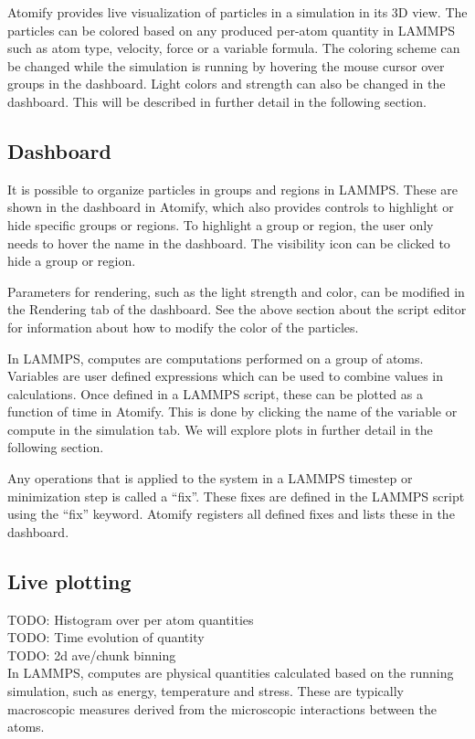 \documentclass[aps,pre,twocolumn,letterpaper,floatfix,nofootinbib]{revtex4}
\begin{document}
Atomify provides live visualization of particles in a simulation in its 3D view. 
The particles can be colored based on any produced per-atom quantity in LAMMPS such as
atom type, velocity, force or a variable formula.
The coloring scheme can be changed while the simulation is running by hovering
the mouse cursor over groups in the dashboard.
Light colors and strength can also be changed in the dashboard.
This will be described in further detail in the following section.

\subsection{Dashboard}

It is possible to organize particles in groups and regions in LAMMPS.
These are shown in the dashboard in Atomify, which also provides controls to
highlight or hide specific groups or regions.
To highlight a group or region, the user only needs to hover the name in the
dashboard.
The visibility icon can be clicked to hide a group or region.

Parameters for rendering, such as the light strength and color,
can be modified in the Rendering tab of the dashboard.
See the above section about the script editor for information about how to
modify the color of the particles.

In LAMMPS, computes are computations performed on a group of atoms.
Variables are user defined expressions which can be used to combine values in
calculations.
Once defined in a LAMMPS script, these can be plotted as a function of time in
Atomify.
This is done by clicking the name of the variable or compute in the simulation
tab.
We will explore plots in further detail in the following section.

Any operations that is applied to the system in a LAMMPS timestep or
minimization step is called a ``fix''.
These fixes are defined in the LAMMPS script using the ``fix'' keyword.
Atomify registers all defined fixes and lists these in the dashboard.

\subsection{Live plotting}
TODO: Histogram over per atom quantities \\
TODO: Time evolution of quantity \\
TODO: 2d ave/chunk binning \\

In LAMMPS, computes are physical quantities calculated based on the running
simulation, such as energy, temperature and stress.
These are typically macroscopic measures derived from the microscopic
interactions between the atoms.
\end{document}
